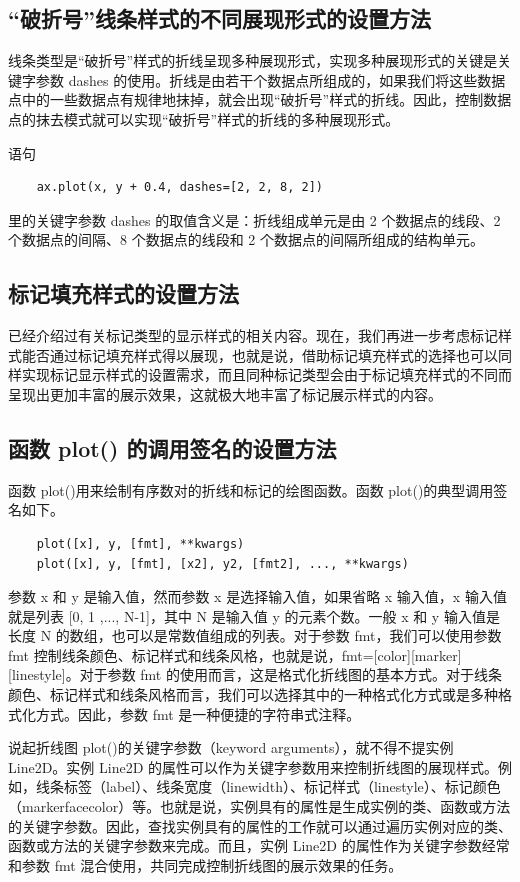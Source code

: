 \subsection{“破折号”线条样式的不同展现形式的设置方法}
线条类型是“破折号”样式的折线呈现多种展现形式，实现多种展现形式的关键是关键字参数 dashes 的使用。折线是由若干个数据点所组成的，如果我们将这些数据点中的一些数据点有规律地抹掉，就会出现“破折号”样式的折线。因此，控制数据点的抹去模式就可以实现“破折号”样式的折线的多种展现形式。

语句
\begin{verbatim}
    ax.plot(x, y + 0.4, dashes=[2, 2, 8, 2])
\end{verbatim}
里的关键字参数 dashes 的取值含义是：折线组成单元是由 2 个数据点的线段、2 个数据点的间隔、8 个数据点的线段和 2 个数据点的间隔所组成的结构单元。

\subsection{标记填充样式的设置方法}
已经介绍过有关标记类型的显示样式的相关内容。现在，我们再进一步考虑标记样式能否通过标记填充样式得以展现，也就是说，借助标记填充样式的选择也可以同样实现标记显示样式的设置需求，而且同种标记类型会由于标记填充样式的不同而呈现出更加丰富的展示效果，这就极大地丰富了标记展示样式的内容。
\subsection{函数 plot() 的调用签名的设置方法}
函数 plot()用来绘制有序数对的折线和标记的绘图函数。函数 plot()的典型调用签名如下。
\begin{verbatim}
    plot([x], y, [fmt], **kwargs)
    plot([x], y, [fmt], [x2], y2, [fmt2], ..., **kwargs)
\end{verbatim}

参数 x 和 y 是输入值，然而参数 x 是选择输入值，如果省略 x 输入值，x 输入值就是列表 [0, 1 ,..., N-1]，其中 N 是输入值 y 的元素个数。一般 x 和 y 输入值是长度 N 的数组，也可以是常数值组成的列表。对于参数 fmt，我们可以使用参数 fmt 控制线条颜色、标记样式和线条风格，也就是说，fmt=[color][marker][linestyle]。对于参数 fmt 的使用而言，这是格式化折线图的基本方式。对于线条颜色、标记样式和线条风格而言，我们可以选择其中的一种格式化方式或是多种格式化方式。因此，参数 fmt 是一种便捷的字符串式注释。

说起折线图 plot()的关键字参数（keyword arguments），就不得不提实例 Line2D。实例 Line2D 的属性可以作为关键字参数用来控制折线图的展现样式。例如，线条标签（label）、线条宽度（linewidth）、标记样式（linestyle）、标记颜色（markerfacecolor）等。也就是说，实例具有的属性是生成实例的类、函数或方法的关键字参数。因此，查找实例具有的属性的工作就可以通过遍历实例对应的类、函数或方法的关键字参数来完成。而且，实例 Line2D 的属性作为关键字参数经常和参数 fmt 混合使用，共同完成控制折线图的展示效果的任务。

